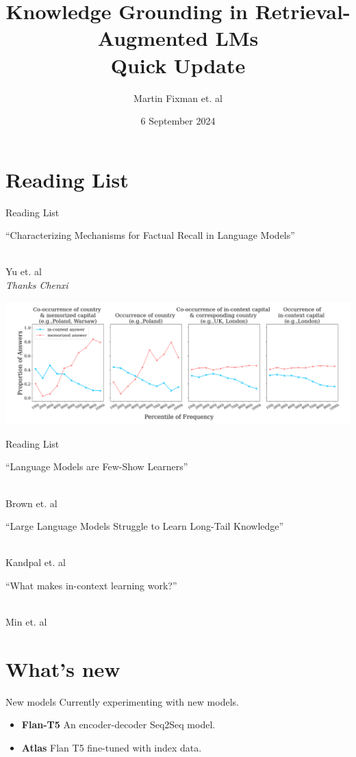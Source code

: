 \documentclass[9pt]{beamer}
\title{Knowledge Grounding in Retrieval-Augmented LMs \\ Quick Update}
\author{Martin Fixman et. al}
\institute{City, University of London}
\date{6 September 2024}
\begin{document}
\begin{frame}
	\titlepage{}
\end{frame}

\section{Reading List}
\begin{frame}{Reading List}
	\begin{large}
		``Characterizing Mechanisms for Factual Recall in Language Models''
	\end{large} \\
	Yu et. al \\
	\textit{\scriptsize Thanks Chenxi}

	\vfill{}

	\begin{center}
		\includegraphics[width=\textwidth]{Mechanisms_plot.png}
	\end{center}
\end{frame}

\begin{frame}{Reading List}
	\begin{large}
		``Language Models are Few-Show Learners''
	\end{large} \\
	Brown et. al

	\quad{}

	\begin{large}
		``Large Language Models Struggle to Learn Long-Tail Knowledge''
	\end{large} \\
	Kandpal et. al

	\quad{}

	\begin{large}
		``What makes in-context learning work?''
	\end{large} \\
	Min et. al
\end{frame}

\section{What's new}
\begin{frame}{New models}
	Currently experimenting with new models. \\
	\begin{itemize}
		\item \textbf{Flan-T5} An encoder-decoder Seq2Seq model.
		\item \textbf{Atlas} Flan T5 fine-tuned with index data.
	\end{itemize}
\end{frame}
\end{document}
